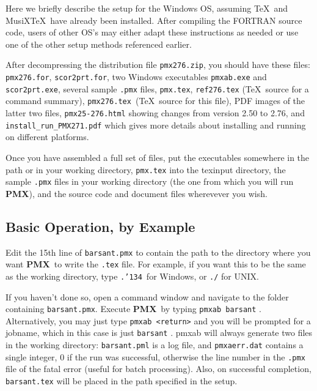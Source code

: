 \documentclass[11pt]{article}
\def\MusiXTeX{MusiX\TeX}
\def\bs{{\tt\char'134}}
\newcommand\PMXX{\textbf{PMX}}
\newcommand\PMX{\PMXX~}
\def\newfrom{2.59}  %
\def\NEW#1{\ifdim#1 pt<\newfrom pt\else%
\marginpar{\fbox{#1}}\fi}
\begin{document}
	Here we briefly describe the setup for the Windows OS,
assuming \TeX\ and \MusiXTeX\ have already been installed. After compiling the
FORTRAN source code, users of other OS's 
may either adapt these instructions as needed or use one of the other setup 
methods referenced earlier. 

After decompressing the distribution file {\tt pmx276.zip}, 
you should have these 
files: \NEW{2.76} {\tt pmx276.for}, {\tt scor2prt.for}, two 
Windows executables {\tt pmxab.exe} and {\tt scor2prt.exe}, several sample 
{\tt .pmx} files,
{\tt pmx.tex}, {\tt ref276.tex} (\TeX\ source for a command summary),
{\tt pmx276.tex }(\TeX\ source for this file), 
PDF images of the latter two files, {\tt pmx25-276.html} showing 
changes from version 2.50 to 2.76, and {\tt install\_run\_PMX271.pdf} which gives more 
details about installing and running on different platforms.


	Once you have assembled a full set of files, put the executables 
somewhere in the path or in your working directory, {\tt pmx.tex} into the 
texinput directory, the sample {\tt *.pmx} files in your working 
directory (the one from which you will run \PMXX), and the source code and 
document files wherevever you wish.

\subsection{Basic Operation, by Example}

Edit the 15th line of {\tt barsant.pmx} to contain the path to the 
directory where you want \PMX to write the {\tt .tex} file.  For example, 
if you want this to be the same as the working directory, type {\tt .\bs}~for Windows, 
or {\tt ./} for UNIX.   

If you haven't done so, open a command window and navigate to the 
folder containing {\tt barsant.pmx}. Execute \PMX by typing 
{\tt pmxab barsant} . Alternatively, you may 
just type {\tt pmxab <return>} and you will be prompted
for a jobname, which in this case is just {\tt barsant} .  
{\bfx pmxab} will always generate two files in the working 
directory: {\tt barsant.pml}
is a log file, and {\tt pmxaerr.dat} contains a single integer, 0 if 
the run was successful, otherwise the line number in the {\tt .pmx} file of the 
fatal error (useful for batch processing).   Also, on successful completion, 
{\tt barsant.tex} will be placed in the path specified in the setup.  
\end{document}
